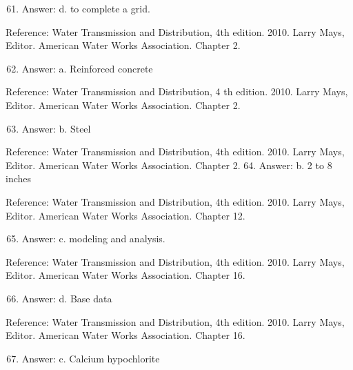 \documentclass[10pt]{article}
\begin{document}
\begin{enumerate}
  \setcounter{enumi}{60}
  \item Answer: d. to complete a grid.
\end{enumerate}

Reference: Water Transmission and Distribution, 4th edition. 2010. Larry Mays, Editor. American Water Works Association. Chapter 2.

\begin{enumerate}
  \setcounter{enumi}{61}
  \item Answer: a. Reinforced concrete
\end{enumerate}

Reference: Water Transmission and Distribution, 4 th edition. 2010. Larry Mays, Editor. American Water Works Association. Chapter 2.

\begin{enumerate}
  \setcounter{enumi}{62}
  \item Answer: b. Steel
\end{enumerate}

Reference: Water Transmission and Distribution, 4th edition. 2010. Larry Mays, Editor. American Water Works Association. Chapter 2. 64. Answer: b. 2 to 8 inches

Reference: Water Transmission and Distribution, 4th edition. 2010. Larry Mays, Editor. American Water Works Association. Chapter 12.

\begin{enumerate}
  \setcounter{enumi}{64}
  \item Answer: c. modeling and analysis.
\end{enumerate}

Reference: Water Transmission and Distribution, 4th edition. 2010. Larry Mays, Editor. American Water Works Association. Chapter 16.

\begin{enumerate}
  \setcounter{enumi}{65}
  \item Answer: d. Base data
\end{enumerate}

Reference: Water Transmission and Distribution, 4th edition. 2010. Larry Mays, Editor. American Water Works Association. Chapter 16.

\begin{enumerate}
  \setcounter{enumi}{66}
  \item Answer: c. Calcium hypochlorite
\end{enumerate}
\end{document}
